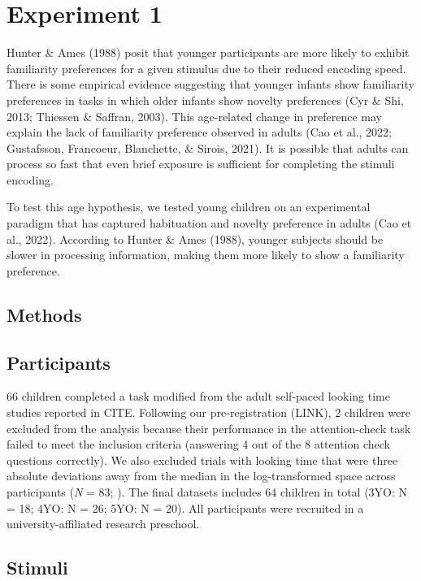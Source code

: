 \documentclass[10pt, letterpaper]{article}
\begin{document}
\hypertarget{experiment-1}{%
\section{Experiment 1}\label{experiment-1}}

Hunter \& Ames (1988) posit that younger participants are more likely to
exhibit familiarity preferences for a given stimulus due to their
reduced encoding speed. There is some empirical evidence suggesting that
younger infants show familiarity preferences in tasks in which older
infants show novelty preferences (Cyr \& Shi, 2013; Thiessen \& Saffran,
2003). This age-related change in preference may explain the lack of
familiarity preference observed in adults (Cao et al., 2022; Gustafsson,
Francoeur, Blanchette, \& Sirois, 2021). It is possible that adults can
process so fast that even brief exposure is sufficient for completing
the stimuli encoding.

To test this age hypothesis, we tested young children on an experimental
paradigm that has captured habituation and novelty preference in adults
(Cao et al., 2022). According to Hunter \& Ames (1988), younger subjects
should be slower in processing information, making them more likely to
show a familiarity preference.

\hypertarget{methods}{%
\subsection{Methods}\label{methods}}

\hypertarget{participants}{%
\subsection{Participants}\label{participants}}

66 children completed a task modified from the adult self-paced looking
time studies reported in CITE. Following our pre-registration (LINK), 2
children were excluded from the analysis because their performance in
the attention-check task failed to meet the inclusion criteria
(answering 4 out of the 8 attention check questions correctly). We also
excluded trials with looking time that were three absolute deviations
away from the median in the log-transformed space across participants
(\emph{N} = 83; ). The final datasets includes 64 children in total
(3YO: N = 18; 4YO: N = 26; 5YO: N = 20). All participants were recruited
in a university-affiliated research preschool.

\hypertarget{stimuli}{%
\subsection{Stimuli}\label{stimuli}}
\end{document}

